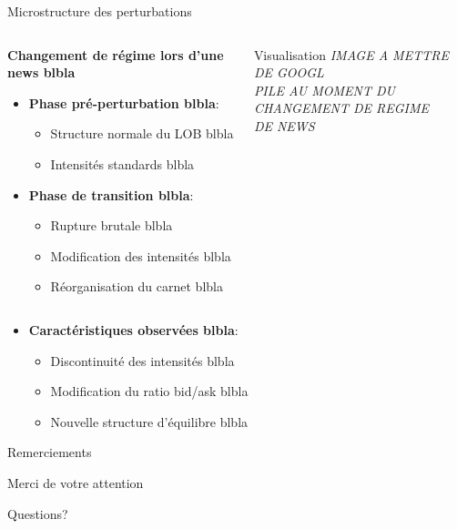 \documentclass[aspectratio=169]{beamer}  %
\begin{document}
\begin{frame}{Microstructure des perturbations}
    \begin{columns}
        \begin{column}{0.6\textwidth}
            \textbf{Changement de régime lors d'une news blbla}
            \begin{itemize}
                \item \textbf{Phase pré-perturbation blbla}:
                \begin{itemize}
                    \item Structure normale du LOB blbla
                    \item Intensités standards blbla
                \end{itemize}
                \item \textbf{Phase de transition blbla}:
                \begin{itemize}
                    \item Rupture brutale blbla
                    \item Modification des intensités blbla
                    \item Réorganisation du carnet blbla
                \end{itemize}
            \end{itemize}
        \end{column}
        \begin{column}{0.4\textwidth}
            \begin{alertblock}{Visualisation}
                \centering
                \textit{IMAGE A METTRE DE GOOGL\\
                PILE AU MOMENT DU\\
                CHANGEMENT DE REGIME\\
                DE NEWS}
            \end{alertblock}
        \end{column}
    \end{columns}
    \vspace{0.2cm}
    \begin{itemize}
        \item \textbf{Caractéristiques observées blbla}:
        \begin{itemize}
            \item Discontinuité des intensités blbla
            \item Modification du ratio bid/ask blbla
            \item Nouvelle structure d'équilibre blbla
        \end{itemize}
    \end{itemize}
\end{frame}

\begin{frame}{Remerciements}
    \begin{center}
        \Large Merci de votre attention
        \vspace{1cm}
        
        \normalsize
        Questions?
    \end{center}
\end{frame}
\end{document}
